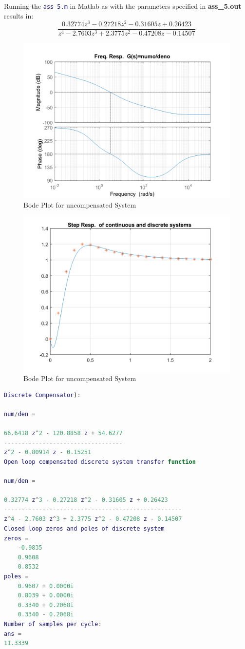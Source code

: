 Running the \lstinline[language=Matlab]|ass_5.m| in Matlab as with the parameters specified in \textbf{ass\_5.out} results in:
\[
\frac{0.32774 z^3 - 0.27218 z^2 - 0.31605 z + 0.26423}{z^4 - 2.7603 z^3 + 2.3775 z^2 - 0.47208 z - 0.14507}
\]
\begin{figure}
	\centering
	\includegraphics[width=0.6\linewidth]{MatlabPlots/bodePlotUnComp.png}
	\caption{Bode Plot for uncompensated System}
	\label{fig:bodePlotUnComp}
\end{figure}

\begin{figure}
	\centering
	\includegraphics[width=0.6\linewidth]{MatlabPlots/stepRespCTSDS.png}
	\caption{Bode Plot for uncompensated System}
	\label{fig:Step Response}
\end{figure}
\begin{lstlisting}[language=Matlab]
Discrete Compensator): 

num/den = 

66.6418 z^2 - 120.8858 z + 54.6277
----------------------------------
z^2 - 0.80914 z - 0.15251
Open loop compensated discrete system transfer function

num/den = 

0.32774 z^3 - 0.27218 z^2 - 0.31605 z + 0.26423
---------------------------------------------------
z^4 - 2.7603 z^3 + 2.3775 z^2 - 0.47208 z - 0.14507
Closed loop zeros and poles of discrete system
zeros =
	-0.9835
	0.9608
	0.8532
poles =
	0.9607 + 0.0000i
	0.8039 + 0.0000i
	0.3340 + 0.2068i
	0.3340 - 0.2068i
Number of samples per cycle:
ans =
11.3339
\end{lstlisting}